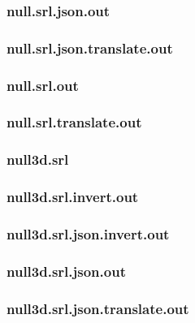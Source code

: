 \subsubsection{null.srl.json.out}
\label{app:null_srl.json.out}

\subsubsection{null.srl.json.translate.out}
\label{app:null_srl.json.translate.out}

\subsubsection{null.srl.out}
\label{app:null_srl.out}

\subsubsection{null.srl.translate.out}
\label{app:null_srl.translate.out}

\subsubsection{null3d.srl}
\label{app:null3d_srl}

\subsubsection{null3d.srl.invert.out}
\label{app:null3d_srl.invert.out}

\subsubsection{null3d.srl.json.invert.out}
\label{app:null3d_srl.json.invert.out}

\subsubsection{null3d.srl.json.out}
\label{app:null3d_srl.json.out}

\subsubsection{null3d.srl.json.translate.out}
\label{app:null3d_srl.json.translate.out}

